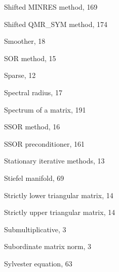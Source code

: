 \begin{description}
{Shifted MINRES method}, {169}\par

{Shifted QMR\_SYM method}, {174}\par

{Smoother}, {18}\par

{SOR method}, {15}\par

{Sparse}, {12}\par

{Spectral radius}, {17}\par

{Spectrum of a matrix}, {191}\par

{SSOR method}, {16}\par

{SSOR preconditioner}, {161}\par

{Stationary iterative methods}, {13}\par

{Stiefel manifold}, {69}\par

{Strictly lower triangular matrix}, {14}\par

{Strictly upper triangular matrix}, {14}\par

{Submultiplicative}, {3}\par

{Subordinate matrix norm}, {3}\par

{Sylvester equation}, {63}\par


\end{description}
